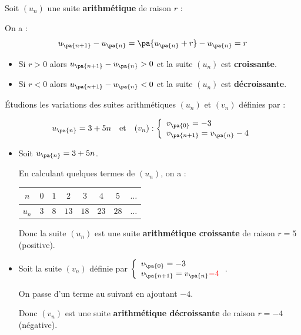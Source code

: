 \begin{demonstration}
	Soit $(u_{n})$ une suite \textbf{arithmétique} de raison $r$ :

	On a :
	\[
		u_{\pa{n + 1}}-u_{\pa{n}} = \pa{u_{\pa{n}} + r}- u_{\pa{n}} = r
	\]

	\begin{itemize}
		\item Si $r > 0$ alors $u_{\pa{n + 1}} - u_{\pa{n}} > 0$ et la suite $(u_{n})$ est \textbf{croissante}.
		\item Si $r < 0$ alors $u_{\pa{n + 1}} - u_{\pa{n}} < 0$ et la suite $(u_{n})$ est \textbf{décroissante}.
	\end{itemize}
\end{demonstration}

\begin{methode}
	Étudions les variations des suites arithmétiques $(u_{n})$ et $(v_{n})$ définies par :

	\[
		u_{\pa{n}} = 3 + 5n \quad\text{et}\quad (v_n):\left\{ \begin{array}{l}v_{\pa{0}} = -3 \\ v_{\pa{n + 1}} = v_{\pa{n}}-4\end{array} \right.
	\]

	\begin{correction}
		\nline
		\begin{itemize}
			\item Soit $u_{\pa{n}} = 3 + 5n$.

			      En calculant quelques termes de $(u_n)$, on a :

			      \begin{center}
				      \begin{tabular}{|c|c|c|c|c|c|c|c|}
					      \hline
					      \ccg $n$   & $0$ & $1$ & $2$  & $3$  & $4$  & $5$  & $\dots$ \\ \hline
					      \ccg $u_n$ & $3$ & $8$ & $13$ & $18$ & $23$ & $28$ & $\dots$ \\ \hline
				      \end{tabular}
			      \end{center}

			      Donc la suite $(u_{n})$ est une suite \textbf{arithmétique croissante} de raison $r=5$ (positive).

			\item Soit la suite $(v_n)$ définie par $\left\{ \begin{array}{l}v_{\pa{0}} = -3 \\ v_{\pa{n + 1}} = v_{\pa{n}}\color{red}{-4}\end{array} \right.$.

			      On passe d'un terme au suivant en ajoutant $-4$.

			      Donc $(v_{n})$ est une suite \textbf{arithmétique décroissante} de raison $r=-4$ (négative).
		\end{itemize}
	\end{correction}
\end{methode}

